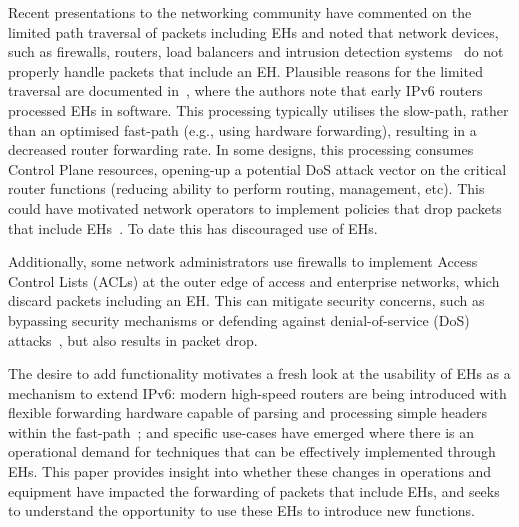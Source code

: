 \documentclass[conference]{IEEEtran}
\begin{document}
Recent presentations to the networking community have commented on the limited
path traversal of packets including EHs and noted that network devices, such as
firewalls, routers, load balancers and intrusion detection
systems~\cite{nalini-iepg114, fernando-talk} do not properly handle packets
that include an EH. 
Plausible reasons for the limited traversal are documented
in~\cite{ietf-v6ops-hbh-03}, where the authors note that early IPv6 routers
processed EHs in software. This processing typically utilises the slow-path,
rather than an optimised fast-path (e.g., using hardware forwarding), resulting
in a decreased router forwarding rate. In some designs, this processing
consumes Control Plane resources, opening-up a potential DoS attack vector on
the critical router functions (reducing ability to perform routing, management,
etc). This could have motivated network operators to implement policies that
drop packets that include EHs~\cite{rfc9098}.  To date this has discouraged use
of EHs. 

Additionally, some network administrators use firewalls to implement Access
Control Lists (ACLs) at the outer edge of access and enterprise networks, which
discard packets including an EH. This can mitigate security concerns, such as
bypassing security mechanisms or defending against denial-of-service (DoS)
attacks~\cite{naagas2021deh}, but also results in packet drop.


The desire to add functionality motivates a fresh look at the usability of EHs
as a mechanism to extend IPv6: modern high-speed routers are being introduced
with flexible forwarding hardware capable of parsing and processing simple
headers within the fast-path~\cite{programmable-data-plane, cisco-silicon-one,
hauser2023}; and specific use-cases have emerged where there is an operational
demand for techniques that can be effectively implemented through EHs.  This
paper provides insight into whether these changes in operations and equipment
have impacted the forwarding of packets that include EHs, and seeks to
understand the opportunity to use these EHs to introduce new functions. 
\end{document}
